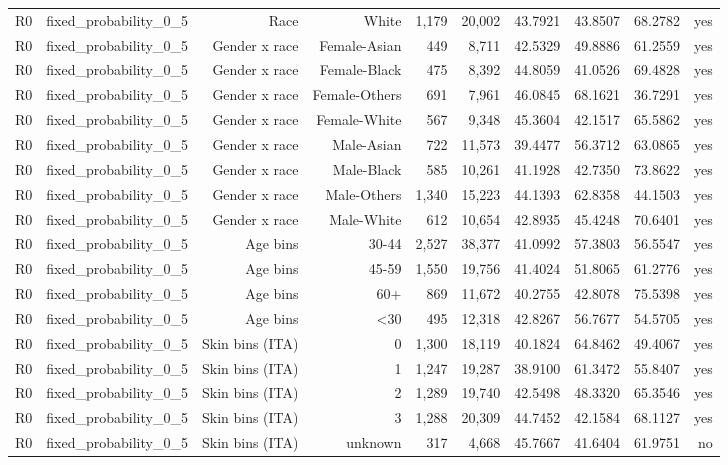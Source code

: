 \documentclass[10pt]{article}
\begin{document}
\begin{longtable}{@{}lrrrrrrrrr@{}}
R0 & fixed\_probability\_0\_5 & Race & White & 1,179 & 20,002 & 43.7921 & 43.8507 & 68.2782 & yes \\
R0 & fixed\_probability\_0\_5 & Gender x race & Female-Asian & 449 & 8,711 & 42.5329 & 49.8886 & 61.2559 & yes \\
R0 & fixed\_probability\_0\_5 & Gender x race & Female-Black & 475 & 8,392 & 44.8059 & 41.0526 & 69.4828 & yes \\
R0 & fixed\_probability\_0\_5 & Gender x race & Female-Others & 691 & 7,961 & 46.0845 & 68.1621 & 36.7291 & yes \\
R0 & fixed\_probability\_0\_5 & Gender x race & Female-White & 567 & 9,348 & 45.3604 & 42.1517 & 65.5862 & yes \\
R0 & fixed\_probability\_0\_5 & Gender x race & Male-Asian & 722 & 11,573 & 39.4477 & 56.3712 & 63.0865 & yes \\
R0 & fixed\_probability\_0\_5 & Gender x race & Male-Black & 585 & 10,261 & 41.1928 & 42.7350 & 73.8622 & yes \\
R0 & fixed\_probability\_0\_5 & Gender x race & Male-Others & 1,340 & 15,223 & 44.1393 & 62.8358 & 44.1503 & yes \\
R0 & fixed\_probability\_0\_5 & Gender x race & Male-White & 612 & 10,654 & 42.8935 & 45.4248 & 70.6401 & yes \\
R0 & fixed\_probability\_0\_5 & Age bins & 30-44 & 2,527 & 38,377 & 41.0992 & 57.3803 & 56.5547 & yes \\
R0 & fixed\_probability\_0\_5 & Age bins & 45-59 & 1,550 & 19,756 & 41.4024 & 51.8065 & 61.2776 & yes \\
R0 & fixed\_probability\_0\_5 & Age bins & 60+ & 869 & 11,672 & 40.2755 & 42.8078 & 75.5398 & yes \\
R0 & fixed\_probability\_0\_5 & Age bins & \textless{}30 & 495 & 12,318 & 42.8267 & 56.7677 & 54.5705 & yes \\
R0 & fixed\_probability\_0\_5 & Skin bins (ITA) & 0 & 1,300 & 18,119 & 40.1824 & 64.8462 & 49.4067 & yes \\
R0 & fixed\_probability\_0\_5 & Skin bins (ITA) & 1 & 1,247 & 19,287 & 38.9100 & 61.3472 & 55.8407 & yes \\
R0 & fixed\_probability\_0\_5 & Skin bins (ITA) & 2 & 1,289 & 19,740 & 42.5498 & 48.3320 & 65.3546 & yes \\
R0 & fixed\_probability\_0\_5 & Skin bins (ITA) & 3 & 1,288 & 20,309 & 44.7452 & 42.1584 & 68.1127 & yes \\
R0 & fixed\_probability\_0\_5 & Skin bins (ITA) & unknown & 317 & 4,668 & 45.7667 & 41.6404 & 61.9751 & no \\

\end{longtable}
\end{document}
